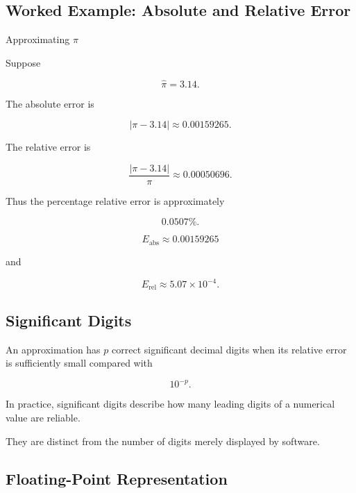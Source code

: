\subsection{Worked Example: Absolute and Relative Error}
\label{subsec:worked-absolute-relative-error}

\begin{workedexamplebox}{Approximating \(\pi\)}

Suppose

\[
\widehat{\pi}=3.14.
\]

The absolute error is

\[
|\pi-3.14|
\approx
0.00159265.
\]

The relative error is

\[
\frac{
|\pi-3.14|
}{
\pi
}
\approx
0.00050696.
\]

Thus the percentage relative error is approximately

\[
0.0507\%.
\]

\begin{answerbox}
\[
\boxed{
E_{\mathrm{abs}}
\approx0.00159265
}
\]

and

\[
\boxed{
E_{\mathrm{rel}}
\approx5.07\times10^{-4}.
}
\]
\end{answerbox}

\end{workedexamplebox}

\subsection{Significant Digits}
\label{subsec:significant-digits}

An approximation has \(p\) correct significant decimal digits when its
relative error is sufficiently small compared with

\[
10^{-p}.
\]

In practice, significant digits describe how many leading digits of a
numerical value are reliable.

They are distinct from the number of digits merely displayed by software.

\subsection{Floating-Point Representation}
\label{subsec:floating-point-representation}

